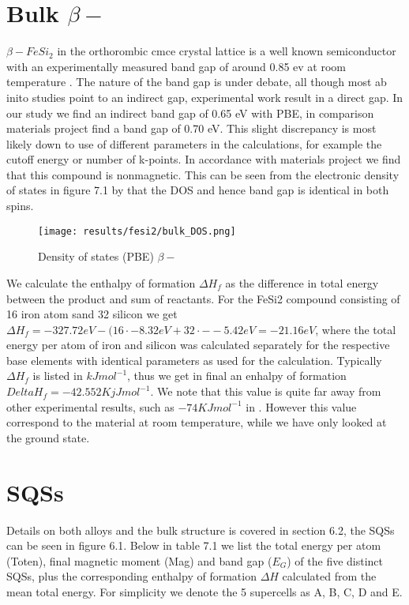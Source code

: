 \section{Bulk $\beta-$ }
$\beta-FeSi_2$ in the orthorombic cmce crystal lattice is a well known semiconductor with an experimentally measured band gap of around 0.85 ev at room temperature \cite{PhysRevB.58.10389}. The nature of the band gap is under debate, all though most ab inito studies point to an indirect gap, experimental work result in a direct gap. In our study we find an indirect band gap of 0.65 eV with PBE, in comparison materials project find a band gap of 0.70 eV. This slight discrepancy is most likely down to use of different parameters in the calculations, for example the cutoff energy or number of k-points. In accordance with materials project we find that this compound is nonmagnetic. This can be seen from the electronic density of states in figure 7.1 by that the DOS and hence band gap is identical in both spins.   

\begin{figure}[H]
\centering
\texttt{[image: results/fesi2/bulk\_DOS.png]}
\caption{Density of states (PBE) $\beta-$ }
\end{figure}

We calculate the enthalpy of formation $\Delta H_f$ as the difference in total energy between the product and sum of reactants. For the FeSi2 compound consisting of 16 iron atom sand 32 silicon we get $\Delta H_f = -327.72 eV - (16 \cdot -8.32 eV + 32 \cdot - -5.42 eV = -21.16 eV$, where the total energy per atom of iron and silicon was calculated separately for the respective base elements with identical parameters as used for the  calculation. Typically $\Delta H_f$ is listed in $kJmol^{-1}$, thus we get in final an enhalpy of formation $Delta H_f = - 42.552 KjJmol^{-1}$. We note that this value is quite far away from other experimental results, such as $-74 KJmol^{-1}$ in \cite{entalpi}. However this value correspond to the material at room temperature, while we have only looked at the ground state. 

\section{ SQSs}
Details on both alloys and the bulk  structure is covered in section 6.2, the SQSs can be seen in figure 6.1. Below in table 7.1 we list the total energy per atom (Toten), final magnetic moment (Mag) and band gap ($E_G$) of the five distinct SQSs, plus the corresponding enthalpy of formation $\Delta H$ calculated from the mean total energy. For simplicity we denote the 5 supercells as A, B, C, D and E. 

